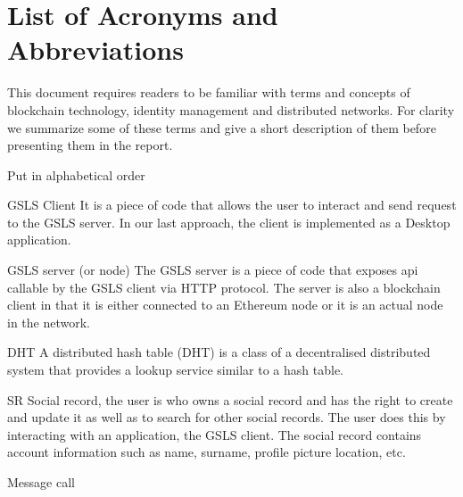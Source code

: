 \documentclass[12pt,twoside]{article}
\newenvironment{notation}{%
   \def\FrameCommand{\colorbox{yellow!20}}%
   \MakeFramed{\advance\hsize-\width \FrameRestore}}
 {\endMakeFramed}
\begin{document}
\clearpage

\tableofcontents

\section*{List of Acronyms and Abbreviations}
\label{list-of-acronyms-and-abbreviations}

This document requires readers to be familiar with terms and concepts of blockchain technology, identity management and distributed networks. For clarity we summarize some of these terms and give a short description of them before presenting them in the report.

\begin{notation}
    Put in alphabetical order
\end{notation}

\begin{basedescript}{\desclabelstyle{\pushlabel}\desclabelwidth{10em}}
\item[GSLS Client]              It is a piece of code that allows the user to interact and send request to the GSLS server. In our last approach, the client is implemented as a Desktop application.
\item[GSLS server (or node)]    The GSLS server is a piece of code that exposes api callable by the GSLS client via HTTP protocol. The server is also a blockchain client in that it is either connected to an Ethereum node or it is an actual node in the network.
\item[DHT]                      A distributed hash table (DHT) is a class of a decentralised distributed system that provides a lookup service similar to a hash table.
\item[SR]                       Social record, the user is who owns a social record and has the right to create and update it as well as to search for other social records. The user does this by interacting with an application, the GSLS client. The social record contains account information such as name, surname, profile picture location, etc.
\item[Message call]
\end{basedescript}


\clearpage







\appendix

\end{document}
